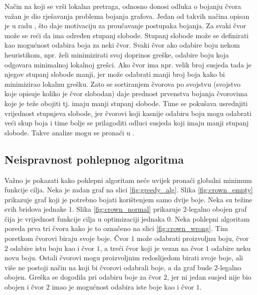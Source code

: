 \documentclass[times, utf8, diplomski, numeric]{fer}
\begin{document}
Način na koji se vrši lokalna pretraga, odnosno donosi odluka o bojanju čvora važan je dio rješavanja problema bojanja grafova. Jedan od takvih načina opisan je u radu \cite{lit11}, što daje motivaciju za proučavanje postupaka bojanja. Za svaki čvor može se reći da ima određen stupanj slobode. Stupanj slobode može se definirati kao mogućnost odabira boja za neki čvor. Svaki čvor ako odabire boju nekom heuristikom, npr. želi minimizirati svoj doprinos greške, odabire boju koja odgovara minimalnoj lokalnoj grešci. Ako čvor ima npr. velik broj susjeda tada je njegov stupanj slobode manji, jer može odabrati manji broj boja kako bi minimizirao lokalnu grešku. Zato se sortiranjem čvorova po svojstvu (svojstvo koje opisuje koliko je čvor slobodan) daje prednost prvenstva bojanja čvorovima koje je teže obojiti tj. imaju manji stupanj slobode. Time se pokušava usrednjiti vrijednost stupnjeva slobode, jer čvorovi koji kasnije odabiru boju mogu odabrati veći skup boja i time bolje se prilagoditi odluci susjeda koji imaju manji stupanj slobode. Takve analize mogu se pronaći u \cite{lit5, lit12}.

\subsection{Neispravnost pohlepnog algoritma}

Važno je pokazati kako pohlepni algoritam neće uvijek pronaći globalni minimum funkcije cilja. Neka je zadan graf na slici \ref{fig:greedy_alg}.
Slika \ref{fig:crown_empty} prikazuje graf koji je potrebno bojati korištenjem samo dvije boje. Neka su težine svih bridova jednake $1$. Slika \ref{fig:crown_normal} prikazuje 2-legalno obojen graf čija je vrijednost funkcije cilja u optimizaciji jednaka $0$. 
Neka pohlepni algoritam poreda prva tri čvora kako je to označeno na slici \ref{fig:crown_wrong}. Tim poretkom čvorovi biraju svoje boje. Čvor $1$ može odabrati proizvoljnu boju, čvor $2$ odabire istu boju kao i čvor $1$, a treći čvor koji je vezan na čvor $1$ odabire neku novu boju. Ostali čvorovi mogu proizvoljnim redoslijedom birati svoje boje, ali više ne postoji način na koji bi čvorovi odabrali boje, a da graf bude 2-legalno obojen. Greška se dogodila pri odabiru boje za čvor $2$, jer ni jedan susjed nije bio obojen i čvor $2$ imao je mogućnost odabira iste boje kao i čvor $1$.
\end{document}
